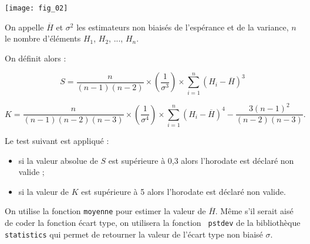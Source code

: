 \begin{center}
\texttt{[image: fig\_02]}
\end{center}


On appelle $\overline{H}$ et $\sigma^2$ les estimateurs non biaisés de l'espérance et de la variance, $n$ le nombre d'éléments $H_1$, $H_2$, ..., $H_n$.

On définit alors :

$$ S = \dfrac{n}{\left(n-1 \right)\left(n-2 \right)}\times \left( \dfrac{1}{\sigma^3}\right)\times \sum\limits_{i=1}^{n} \left(H_i - \overline{H} \right)^3
$$

$$ K = \dfrac{n}{\left(n-1 \right)\left(n-2 \right)\left(n-3 \right)}\times \left( \dfrac{1}{\sigma^4}\right)\times \sum\limits_{i=1}^{n} \left(H_i - \overline{H} \right)^4
-\dfrac{3\left(n-1 \right)^2}{\left(n-2 \right)\left(n-3 \right)}.
$$


Le test suivant est appliqué :
\begin{itemize}
\item si la valeur absolue de $S$ est supérieure à 0,3 alors l’horodate est déclaré non valide ;
\item si la valeur de $K$ est supérieure à 5 alors l’horodate est déclaré non valide.
\end{itemize}
On utilise la fonction \texttt{moyenne} pour estimer la valeur de $\overline{H}$. 
Même s'il serait aisé de coder la fonction écart type, on utilisera la fonction \texttt{
pstdev} de la bibliothèque \texttt{statistics} qui permet de retourner la valeur de l’écart type non biaisé $\sigma$.



